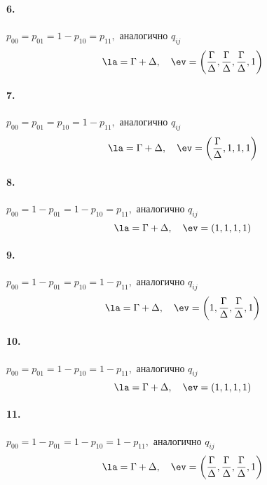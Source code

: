 \paragraph{6.} $p_{00} = p_{01} = 1 - p_{10} = p_{11},$ аналогично $q_{ij}$
\begin{equation*}
\la = \Gamma +\Delta, \quad \ev = \left( \frac{\Gamma }{\Delta },\frac{\Gamma }{\Delta },\frac{\Gamma }{\Delta }, 1 \right)
\end{equation*}

\paragraph{7.} $p_{00} = p_{01} = p_{10} = 1 - p_{11},$ аналогично $q_{ij}$
\begin{equation*}
\la = \Gamma +\Delta, \quad \ev = \left( \frac{\Gamma }{\Delta }, 1, 1, 1 \right)
\end{equation*}

\paragraph{8.} $p_{00} = 1 - p_{01} = 1 - p_{10} = p_{11},$ аналогично $q_{ij}$
\begin{equation*}
\la = \Gamma +\Delta, \quad \ev = \left( 1, 1, 1, 1 \right)
\end{equation*}

\paragraph{9.} $p_{00} = 1 - p_{01} = p_{10} = 1 - p_{11},$ аналогично $q_{ij}$
\begin{equation*}
\la = \Gamma +\Delta, \quad \ev = \left( 1, \frac{\Gamma }{\Delta }, \frac{\Gamma }{\Delta }, 1 \right)
\end{equation*}

\paragraph{10.} $p_{00} = p_{01} = 1 - p_{10} = 1 - p_{11},$ аналогично $q_{ij}$
\begin{equation*}
\la = \Gamma +\Delta, \quad \ev = \left( 1, 1, 1, 1 \right)
\end{equation*}

\paragraph{11.} $p_{00} = 1 - p_{01} = 1 - p_{10} = 1 - p_{11},$ аналогично $q_{ij}$
\begin{equation*}
\la = \Gamma +\Delta, \quad \ev = \left( \frac{\Gamma }{\Delta }, \frac{\Gamma }{\Delta }, \frac{\Gamma }{\Delta }, 1 \right)
\end{equation*}